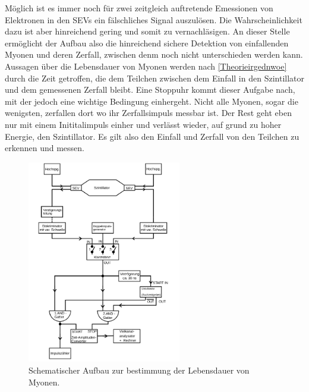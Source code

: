 Möglich ist es immer noch für zwei zeitgleich auftretende Emessionen von Elektronen in den SEVs ein fälschliches Signal auszulösen. Die Wahrscheinlichkeit dazu ist aber hinreichend gering
und somit zu vernachläsigen. An dieser Stelle ermöglicht der Aufbau also die hinreichend sichere Detektion von einfallenden Myonen und deren Zerfall, zwischen denm noch nicht unterschieden werden kann. 
\\
\newline
Aussagen über die Lebensdauer von Myonen werden nach \ref{Theorieirgednwoe} durch die Zeit getroffen, die dem Teilchen zwischen dem Einfall in den Szintillator und dem gemessenen 
Zerfall bleibt. Eine Stoppuhr kommt dieser Aufgabe nach, mit der jedoch eine wichtige Bedingung einhergeht. 
Nicht alle Myonen, sogar die wenigsten, zerfallen dort wo ihr Zerfallsimpuls messbar ist. Der Rest geht eben nur mit einem Inititalimpuls einher und verlässt wieder, auf grund zu hoher Energie, den Szintillator.
Es gilt also den Einfall und Zerfall von den Teilchen zu erkennen und messen.








\begin{figure}
    \centering
    \includegraphics[width=0.6\textwidth]{bilder/aufbau.png}
    \caption{Schematischer Aufbau zur bestimmung der Lebensdauer von Myonen. \cite{skript}} 
    \label{fig:1}
\end{figure}